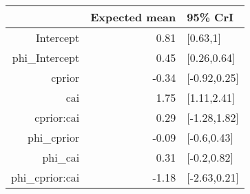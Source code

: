 \begin{tabular}{rrl}
  \hline
 & Expected mean & 95\% CrI \\ 
  \hline
Intercept & 0.81 & [0.63,1] \\ 
  phi\_Intercept & 0.45 & [0.26,0.64] \\ 
  cprior & -0.34 & [-0.92,0.25] \\ 
  cai & 1.75 & [1.11,2.41] \\ 
  cprior:cai & 0.29 & [-1.28,1.82] \\ 
  phi\_cprior & -0.09 & [-0.6,0.43] \\ 
  phi\_cai & 0.31 & [-0.2,0.82] \\ 
  phi\_cprior:cai & -1.18 & [-2.63,0.21] \\ 
   \hline
\end{tabular}

